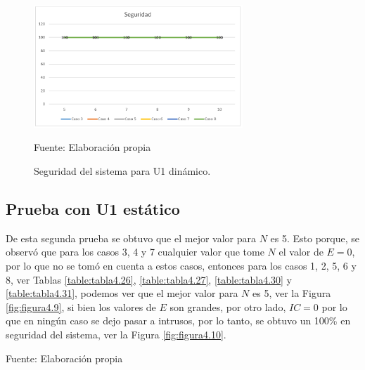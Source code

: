 \begin{figure}[H]
\begin{center}
\includegraphics[width=0.7\textwidth]{Imagenes/Cap4/image008}
\end{center}
\begin{center}
\vskip -0.5cm
\caption{\small{Seguridad del sistema para U1 dinámico.}}
\label{fig:figura4.8}
{\small{Fuente: Elaboración propia}}
\end{center}
\end{figure}

\subsection{Prueba con U1 estático}
\par
De esta segunda prueba se obtuvo que el mejor valor para $N$ es 5. Esto porque, se observó que para los casos 3, 4 y 7 cualquier valor que tome $N$ el valor de $E = 0$, por lo que no se tomó en cuenta a estos casos, entonces para los casos 1, 2, 5, 6 y 8, ver Tablas \ref{table:tabla4.26}, \ref{table:tabla4.27}, \ref{table:tabla4.30} y \ref{table:tabla4.31}, podemos ver que el mejor valor para $N$ es 5, ver la Figura \ref{fig:figura4.9}, si bien los valores de $E$ son grandes, por otro lado, $IC = 0$ por lo que en ningún caso se dejo pasar a intrusos, por lo tanto, se obtuvo un 100\% en seguridad del sistema, ver la Figura \ref{fig:figura4.10}.

\begin{center}
\begin{table}[H]
\centering
\caption{\small{Resultados para el caso 1 con U1 estático.}}
\label{table:tabla4.26}
\begin{center}
\vskip 0.2cm
{\small{Fuente: Elaboración propia}}
\end{center}
\end{table}
\end{center}

